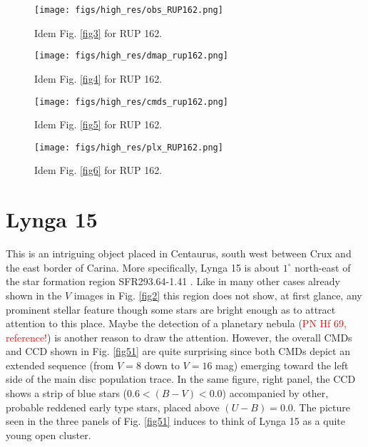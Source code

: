 \documentclass{aa}
\begin{document}
\begin{figure*}[ht]
    \centering
    \texttt{[image: figs/high\_res/obs\_RUP162.png]}
    \caption{Idem Fig. \ref{fig3} for RUP 162.}
    \label{fig47}
\end{figure*}
\begin{figure*}[ht]
    \centering
    \texttt{[image: figs/high\_res/dmap\_rup162.png]}
    \caption{Idem Fig. \ref{fig4} for RUP 162.}
    \label{fig48}
\end{figure*}
\begin{figure*}[ht]
    \centering
    \texttt{[image: figs/high\_res/cmds\_rup162.png]}
    \caption{Idem Fig. \ref{fig5} for RUP 162.}
    \label{fig49}
\end{figure*}
\begin{figure*}[ht]
    \centering
    \texttt{[image: figs/high\_res/plx\_RUP162.png]}
    \caption{Idem Fig. \ref{fig6} for RUP 162.}
    \label{fig50}
\end{figure*}




\section{Lynga 15}

This is an intriguing object placed in Centaurus, south west between Crux and the
east border of Carina. More specifically, Lynga 15 is about $1^\circ$ north-east
of the star formation region SFR293.64-1.41 \citep{Avedisova_2002}. Like in many
other cases already shown in the $V$ images in Fig. \ref{fig2} this region does
not show, at first glance, any prominent stellar feature though some stars are
bright enough as to attract attention to this place. Maybe the detection of a
planetary nebula (\textcolor{red}{PN Hf 69, reference!}) is another reason to
draw the attention. However, the overall CMDs and CCD shown in Fig. \ref{fig51}
are quite surprising since both CMDs depict an extended sequence (from $V = 8$
down to $V = 16$ mag) emerging toward the left side of the main disc population
trace. In the same figure, right panel, the CCD shows a strip of blue stars
($0.6<(B-V)<0.0$) accompanied by other, probable reddened early type stars,
placed above $(U-B) = 0.0$. The picture seen in the three panels of Fig.
\ref{fig51} induces to think of Lynga 15 as a quite young open cluster.\\
\end{document}
